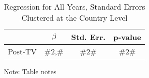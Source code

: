 \noindent 
\begin{table}[H]
\caption{Regression for All Years, Standard Errors Clustered at the Country-Level\label{tab:regression_cls}}
\medskip{}

\begin{centering}
\begin{tabular}{cccc}
\hline 
 & $\beta$ & Std. Err. & p-value\tabularnewline
\hline 
Post-TV & \#2,\# & \#2\# & \#2\#\tabularnewline
\hline 
\end{tabular}
\par\end{centering}
\begin{centering}
\medskip{}
\par\end{centering}
{\footnotesize{}Note: Table notes}{\footnotesize\par}
\end{table}